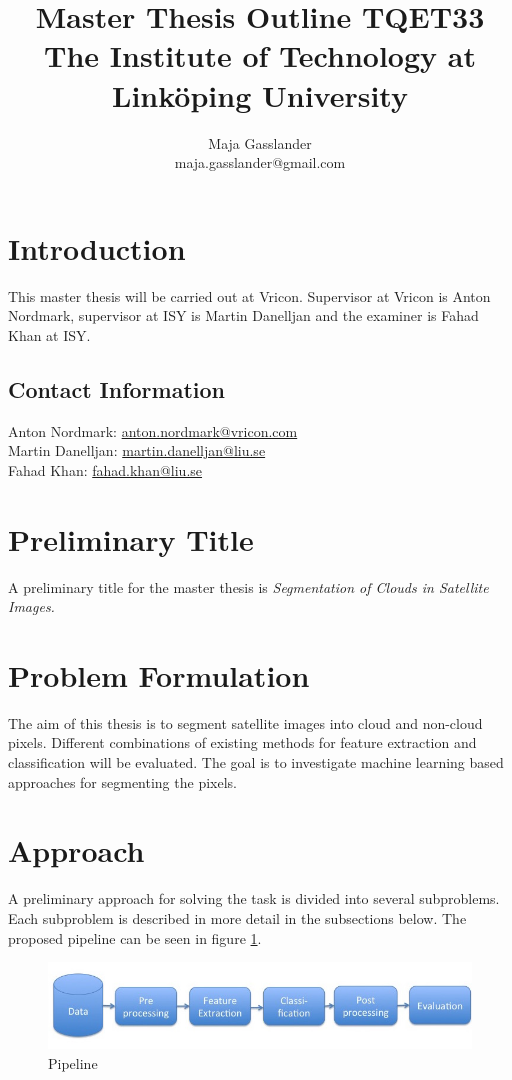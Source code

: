 \documentclass{article}
\title{Master Thesis Outline TQET33 \\
\normalsize{The Institute of Technology at Linköping University}}
\author{Maja Gasslander \\ \normalsize{maja.gasslander@gmail.com}}
\begin{document}
\maketitle
\newpage
\section{Introduction}
This master thesis will be carried out at Vricon. Supervisor at Vricon is Anton Nordmark, supervisor at ISY is Martin Danelljan and the examiner is Fahad Khan at ISY. 

\subsection{Contact Information}
Anton Nordmark: \href{mailto:anton.nordmark@vricon.com}{anton.nordmark@vricon.com}\\
Martin Danelljan: \href{mailto:martin.danelljan@liu.se}{martin.danelljan@liu.se} \\
Fahad Khan: \href{mailto:fahad.khan@liu.se}{fahad.khan@liu.se}


\section{Preliminary Title}
A preliminary title for the master thesis is \emph{Segmentation of Clouds in Satellite Images.} 

\section{Problem Formulation}
The aim of this thesis is to segment satellite images into cloud and non-cloud pixels. Different combinations of existing methods for feature extraction and classification will be evaluated. The goal is to investigate machine learning based approaches for segmenting the pixels.

\section{Approach}
A preliminary approach for solving the task is divided into several subproblems. Each subproblem is described in more detail in the subsections below. The proposed pipeline can be seen in figure \ref{fig:pipeline}.

\begin{figure}[h!]
    \centering
    \includegraphics[scale=0.5]{fig/pipeline}
    \caption{Pipeline}
    \label{fig:pipeline}
\end{figure}
\end{document}
